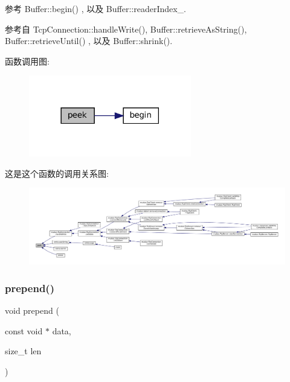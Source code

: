参考 Buffer\+::begin() , 以及 Buffer\+::reader\+Index\+\_\+.



参考自 Tcp\+Connection\+::handle\+Write(), Buffer\+::retrieve\+As\+String(), Buffer\+::retrieve\+Until() , 以及 Buffer\+::shrink().

函数调用图\+:
\nopagebreak
\begin{figure}[H]
\begin{center}
\leavevmode
\includegraphics[width=201pt]{classmuduo_1_1Buffer_ad1339d8b1a42e9762ae6cd3add003706_cgraph}
\end{center}
\end{figure}
这是这个函数的调用关系图\+:
\nopagebreak
\begin{figure}[H]
\begin{center}
\leavevmode
\includegraphics[width=350pt]{classmuduo_1_1Buffer_ad1339d8b1a42e9762ae6cd3add003706_icgraph}
\end{center}
\end{figure}
\mbox{\label{classmuduo_1_1Buffer_a3099092e4d4138f55fb825a50f50f24b}} 
\subsubsection{\texorpdfstring{prepend()}{prepend()}}
{\footnotesize\ttfamily void prepend (\begin{DoxyParamCaption}\item[{const void $\ast$}]{data,  }\item[{size\+\_\+t}]{len }\end{DoxyParamCaption})\hspace{0.3cm}{\ttfamily [inline]}}



